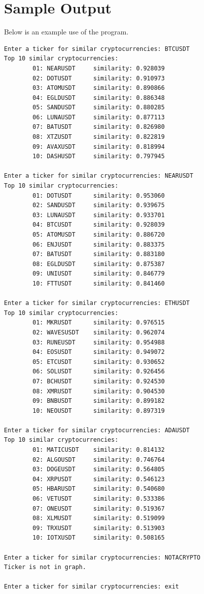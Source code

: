 \documentclass[11pt]{article}
\begin{document}
\section{Sample Output}
Below is an example use of the program.\\[2mm]
\begin{verbatim}
Enter a ticker for similar cryptocurrencies: BTCUSDT
Top 10 similar cryptocurrencies:
        01: NEARUSDT     similarity: 0.928039
        02: DOTUSDT      similarity: 0.910973
        03: ATOMUSDT     similarity: 0.890866
        04: EGLDUSDT     similarity: 0.886348
        05: SANDUSDT     similarity: 0.880285
        06: LUNAUSDT     similarity: 0.877113
        07: BATUSDT      similarity: 0.826980
        08: XTZUSDT      similarity: 0.822819
        09: AVAXUSDT     similarity: 0.818994
        10: DASHUSDT     similarity: 0.797945

Enter a ticker for similar cryptocurrencies: NEARUSDT
Top 10 similar cryptocurrencies:
        01: DOTUSDT      similarity: 0.953060
        02: SANDUSDT     similarity: 0.939675
        03: LUNAUSDT     similarity: 0.933701
        04: BTCUSDT      similarity: 0.928039
        05: ATOMUSDT     similarity: 0.886720
        06: ENJUSDT      similarity: 0.883375
        07: BATUSDT      similarity: 0.883180
        08: EGLDUSDT     similarity: 0.875387
        09: UNIUSDT      similarity: 0.846779
        10: FTTUSDT      similarity: 0.841460

Enter a ticker for similar cryptocurrencies: ETHUSDT
Top 10 similar cryptocurrencies:
        01: MKRUSDT      similarity: 0.976515
        02: WAVESUSDT    similarity: 0.962074
        03: RUNEUSDT     similarity: 0.954988
        04: EOSUSDT      similarity: 0.949072
        05: ETCUSDT      similarity: 0.930652
        06: SOLUSDT      similarity: 0.926456
        07: BCHUSDT      similarity: 0.924530
        08: XMRUSDT      similarity: 0.904530
        09: BNBUSDT      similarity: 0.899182
        10: NEOUSDT      similarity: 0.897319

Enter a ticker for similar cryptocurrencies: ADAUSDT
Top 10 similar cryptocurrencies:
        01: MATICUSDT    similarity: 0.814132
        02: ALGOUSDT     similarity: 0.746764
        03: DOGEUSDT     similarity: 0.564805
        04: XRPUSDT      similarity: 0.546123
        05: HBARUSDT     similarity: 0.540680
        06: VETUSDT      similarity: 0.533386
        07: ONEUSDT      similarity: 0.519367
        08: XLMUSDT      similarity: 0.519099
        09: TRXUSDT      similarity: 0.513903
        10: IOTXUSDT     similarity: 0.508165

Enter a ticker for similar cryptocurrencies: NOTACRYPTO
Ticker is not in graph.

Enter a ticker for similar cryptocurrencies: exit
\end{verbatim}
\end{document}
